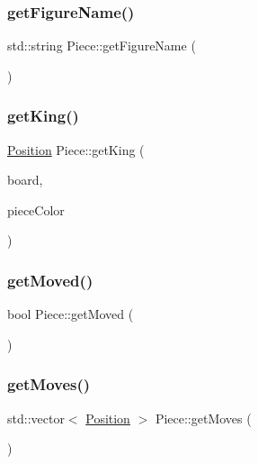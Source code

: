 \subsubsection{\texorpdfstring{get\+Figure\+Name()}{getFigureName()}}
{\footnotesize\ttfamily std\+::string Piece\+::get\+Figure\+Name (\begin{DoxyParamCaption}{ }\end{DoxyParamCaption})}

\mbox{\label{class_piece_a8537f9ebe9b135e3e5da99f385a90042}} 
\subsubsection{\texorpdfstring{get\+King()}{getKing()}}
{\footnotesize\ttfamily \hyperlink{struct_position}{Position} Piece\+::get\+King (\begin{DoxyParamCaption}\item[{std\+::shared\+\_\+ptr$<$ \hyperlink{class_base_board}{Base\+Board} $>$}]{board,  }\item[{\hyperlink{_piece_8h_ad7595c48bb74c0dd2a7648712a2d4985}{Piece\+Color}}]{piece\+Color }\end{DoxyParamCaption})}

\mbox{\label{class_piece_ad23431fecbbedcff824dd38ffa6a47a1}} 
\subsubsection{\texorpdfstring{get\+Moved()}{getMoved()}}
{\footnotesize\ttfamily bool Piece\+::get\+Moved (\begin{DoxyParamCaption}{ }\end{DoxyParamCaption})}

\mbox{\label{class_piece_a10eddaa8ade831cfee1c17b94bfcac09}} 
\subsubsection{\texorpdfstring{get\+Moves()}{getMoves()}}
{\footnotesize\ttfamily std\+::vector$<$ \hyperlink{struct_position}{Position} $>$ Piece\+::get\+Moves (\begin{DoxyParamCaption}{ }\end{DoxyParamCaption})}

